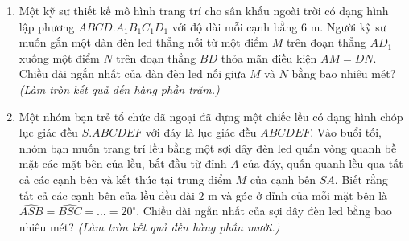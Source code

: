 \documentclass[12pt,a4paper]{article}
\begin{document}
\begin{enumerate}
\item \begin{minipage}[t]{0.65\linewidth}
Một kỹ sư thiết kế mô hình trang trí cho sân khấu ngoài trời có dạng hình lập phương $ABCD.A_1B_1C_1D_1$ với độ dài mỗi cạnh bằng $6\text{ m}$. Người kỹ sư muốn gắn một dàn đèn led thẳng nối từ một điểm $M$ trên đoạn thẳng $AD_1$ xuống một điểm $N$ trên đoạn thẳng $BD$ thỏa mãn điều kiện $AM = DN$. Chiều dài ngắn nhất của dàn đèn led nối giữa $M$ và $N$ bằng bao nhiêu mét? \textit{(Làm tròn kết quả đến hàng phần trăm.)}
\end{minipage}\hfill
\begin{minipage}[t]{0.32\linewidth}
\vspace{-0.3\baselineskip}
\centering
{}
\end{minipage}

\item Một nhóm bạn trẻ tổ chức dã ngoại đã dựng một chiếc lều có dạng hình chóp lục giác đều $S.ABCDEF$ với đáy là lục giác đều $ABCDEF$. Vào buổi tối, nhóm bạn muốn trang trí lều bằng một sợi dây đèn led quấn vòng quanh bề mặt các mặt bên của lều, bắt đầu từ đỉnh $A$ của đáy, quấn quanh lều qua tất cả các cạnh bên và kết thúc tại trung điểm $M$ của cạnh bên $SA$. Biết rằng tất cả các cạnh bên của lều đều dài $2\text{ m}$ và góc ở đỉnh của mỗi mặt bên là $\widehat{ASB} = \widehat{BSC} = \dots = 20^\circ$. Chiều dài ngắn nhất của sợi dây đèn led bằng bao nhiêu mét? \textit{(Làm tròn kết quả đến hàng phần mười.)}
\end{enumerate}
\end{document}
